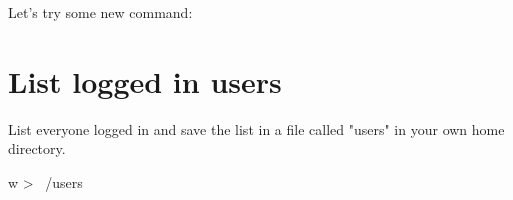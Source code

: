 \documentclass{article}
\begin{document}
Let's try some new command:

\section{List logged in users}

List everyone logged in and save the list in a file called "users" in your own home directory.

w > ~/users
\end{document}
